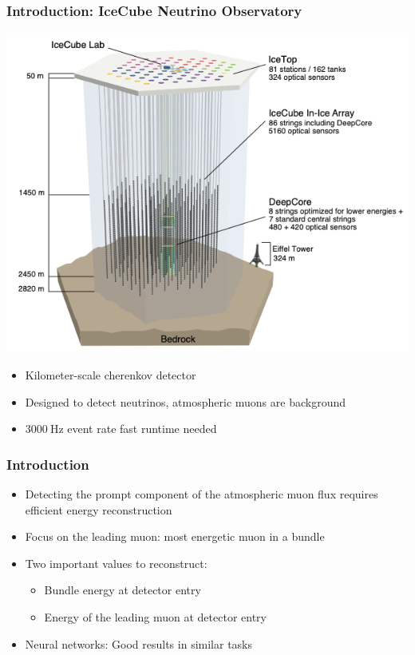 \documentclass[aspectratio=1610, 9pt]{beamer}
\begin{document}
\begin{frame}
  \frametitle{Introduction: IceCube Neutrino Observatory}
  \includegraphics[scale=0.3]{Plots/IceCube schematic}
  \begin{itemize}
    \item Kilometer-scale cherenkov detector \cite{Aartsen_2017}
    \item Designed to detect neutrinos, atmospheric muons are background
    \item $\SI{3000}{\hertz}$ event rate \rightarrow fast runtime needed
  \end{itemize}
\end{frame}
\begin{frame}
  \frametitle{Introduction}
  \begin{itemize}
    \item Detecting the prompt component of the atmospheric muon flux requires efficient energy reconstruction
    \item Focus on the leading muon: most energetic muon in a bundle
    \item Two important values to reconstruct:
    \begin{itemize}
      \item Bundle energy at detector entry
      \item Energy of the leading muon at detector entry
    \end{itemize}
    \item Neural networks: Good results in similar tasks
  \end{itemize}
\end{frame}
\end{document}
